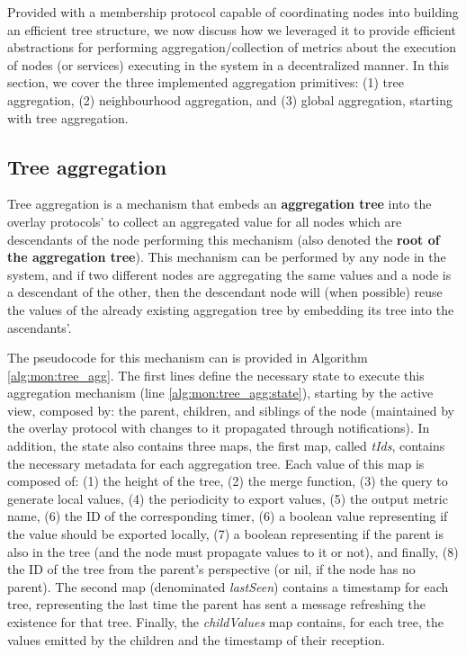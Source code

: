 
Provided with a membership protocol capable of coordinating nodes into building an efficient tree structure, we now discuss how we leveraged it to provide efficient abstractions for performing aggregation/collection of metrics about the execution of nodes (or services) executing in the system in a decentralized manner. In this section, we cover the three implemented aggregation primitives: (1) tree aggregation, (2) neighbourhood aggregation, and (3) global aggregation, starting with tree aggregation.

\subsection{Tree aggregation} \label{sec:mon_protocol:tree_agg}

Tree aggregation is a mechanism that embeds an \textbf{aggregation tree} into the overlay protocols' to collect an aggregated value for all nodes which are descendants of the node performing this mechanism (also denoted the \textbf{root of the aggregation tree}). This mechanism can be performed by any node in the system, and if two different nodes are aggregating the same values and a node is a descendant of the other, then the descendant node will (when possible) reuse the values of the already existing aggregation tree by embedding its tree into the ascendants'.

The pseudocode for this mechanism can is provided in Algorithm \ref{alg:mon:tree_agg}. The first lines define the necessary state to execute this aggregation mechanism (line \ref{alg:mon:tree_agg:state}), starting by the active view, composed by: the parent, children, and siblings of the node (maintained by the overlay protocol with changes to it propagated through notifications). In addition, the state also contains three maps, the first map, called \textit{tIds}, contains the necessary metadata for each aggregation tree. Each value of this map is composed of: (1) the height of the tree, (2) the merge function, (3) the query to generate local values, (4) the periodicity to export values, (5) the output metric name, (6) the ID of the corresponding timer, (6) a boolean value representing if the value should be exported locally, (7) a boolean representing if the parent is also in the tree (and the node must propagate values to it or not), and finally, (8) the ID of the tree from the parent's perspective (or nil, if the node has no parent). The second map (denominated \textit{lastSeen}) contains a timestamp for each tree, representing the last time the parent has sent a message refreshing the existence for that tree. Finally, the \textit{childValues} map contains, for each tree, the values emitted by the children and the timestamp of their reception.

